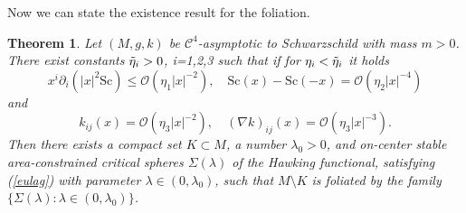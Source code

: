 \documentclass[12pt,a4paper]{amsart}
\theoremstyle{plain}
\newtheorem{theorem}{Theorem}[section]
\theoremstyle{definition}
\begin{document}
Now we can state the existence result for the foliation.
\begin{theorem}\label{exisfoli}
    Let $(M,g,k)$ be $ \mathcal{C}^4$-asymptotic to Schwarzschild with mass $m>0$. There exist constants $ \Tilde{\eta}_i>0$, i=1,2,3 such that if for $\eta_i< \Tilde{\eta}_i $ it holds 
\begin{equation}\label{assumptionsscalar}
    x^i \partial_i (|x|^2 \mathrm{Sc}) \leq \mathcal{O} (\eta_1 |x|^{-2}),\quad  \mathrm{Sc}(x)-\mathrm{Sc}(-x) = \mathcal{O} (\eta_2 |x|^{-4})
\end{equation}
and 
\begin{equation}
k_{ij}(x) = \mathcal{O}(\eta_3 |x|^{-2}) , \quad (\nabla k)_{ij}(x)= \mathcal{O}(\eta_3 |x|^{-3}). 
\end{equation}
 Then there exists a compact set \(K \subset M\), a number \(\lambda_0 > 0\), and on-center stable area-constrained critical
spheres \(\Sigma(\lambda)\) of the Hawking functional, satisfying (\ref{eulag}) with parameter  \(\lambda \in (0, \lambda_0)\), such that \(M \setminus K\) is foliated by the family
\(\{\Sigma(\lambda) : \lambda \in (0, \lambda_0)\}\).
\end{theorem}
\end{document}
